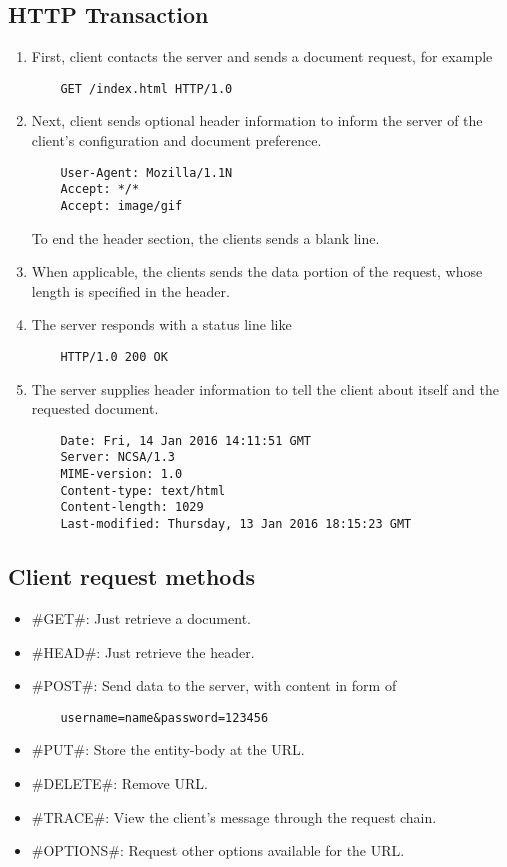 \documentclass[a4paper]{article}
\begin{document}
\subsection{HTTP Transaction}
\begin{enumerate}
  \item First, client contacts the server and sends a document request, for example
	\begin{verbatim}
	GET /index.html HTTP/1.0
	\end{verbatim}
  \item Next, client sends optional header information to inform the server of the client's configuration and document preference.
	\begin{verbatim}
	User-Agent: Mozilla/1.1N
	Accept: */*
	Accept: image/gif
	\end{verbatim}
	To end the header section, the clients sends a blank line.
  \item When applicable, the clients sends the data portion of the request, whose length is specified in the header.
  \item The server responds with a status line like
	\begin{verbatim}
	HTTP/1.0 200 OK
	\end{verbatim}
  \item The server supplies header information to tell the client about itself and the requested document.
	\begin{verbatim}
	Date: Fri, 14 Jan 2016 14:11:51 GMT
	Server: NCSA/1.3
	MIME-version: 1.0
	Content-type: text/html
	Content-length: 1029
	Last-modified: Thursday, 13 Jan 2016 18:15:23 GMT
	\end{verbatim}
\end{enumerate}

\subsection{Client request methods}

\begin{itemize}
  \item #GET#: Just retrieve a document.
  \item #HEAD#: Just retrieve the header.
  \item #POST#: Send data to the server, with content in form of
	\begin{verbatim}
	username=name&password=123456
	\end{verbatim}
  \item #PUT#: Store the entity-body at the URL.
  \item #DELETE#: Remove URL.
  \item #TRACE#: View the client's message through the request chain.
  \item #OPTIONS#: Request other options available for the URL.
\end{itemize}
\end{document}
